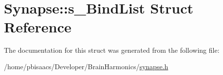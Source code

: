 \hypertarget{structSynapse_1_1s__BindList}{}\section{Synapse\+:\+:s\+\_\+\+Bind\+List Struct Reference}
\label{structSynapse_1_1s__BindList}


The documentation for this struct was generated from the following file\+:\begin{DoxyCompactItemize}
\item 
/home/pbisaacs/\+Developer/\+Brain\+Harmonics/\mbox{\hyperlink{synapse_8h}{synapse.\+h}}\end{DoxyCompactItemize}
